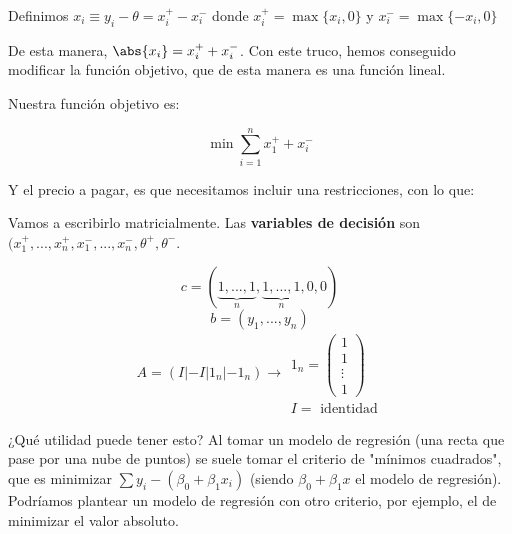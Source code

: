 \begin{problem}[9]
Definimos $x_i \equiv y_i - \theta = x_i^+ - x_i^-$ donde $x_i^+ = \max\{x_i,0\}$ y $x_i^- = \max\{-x_i,0\}$

De esta manera, $\abs{x_i} = x_i^+ + x_i^-$. Con este truco, hemos conseguido modificar la función objetivo, que de esta manera es una función lineal.

Nuestra función objetivo es:

\[\min \sum_{i=1}^n x_1^+ + x_i^-\]

Y el precio a pagar, es que necesitamos incluir una restricciones, con lo que:


\begin{ioprob}
\goal{\[\min \sum_{i=1}^n x_1^+ + x_i^-\]}
\end{ioprob}


Vamos a escribirlo matricialmente.
Las \textbf{variables de decisión} son $(x_1^+,...,x_n^+,x_1^-,...,x_n^-,\theta^+,\theta^-$. 

\[c = (\underbrace{1,...,1}_{n},\underbrace{1,...,1}_{n},0,0)\]
\[b = (y_1,...,y_n) \]
\[A = \left( I | -I | 1_n | -1_n\right)\to \begin{array}{c}1_n = \begin{pmatrix}1\\1\\\vdots\\1\end{pmatrix}\\ I = \text{ identidad} \end{array}\]




\obs{}
¿Qué utilidad puede tener esto?
Al tomar un modelo de regresión (una recta que pase por una nube de puntos) se suele tomar el criterio de "mínimos cuadrados", que es minimizar $\sum y_i-(β_0+β_1x_i)$ (siendo $β_0+β_1x$ el modelo de regresión). 
Podríamos plantear un modelo de regresión con otro criterio, por ejemplo, el de minimizar el valor absoluto.




\end{problem}